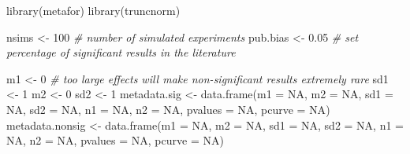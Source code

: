 \documentclass[
  oneside]{book}
\newenvironment{Shaded}{\begin{snugshade}}{\end{snugshade}}
\newcommand{\AttributeTok}[1]{\textcolor[rgb]{0.77,0.63,0.00}{#1}}
\newcommand{\CommentTok}[1]{\textcolor[rgb]{0.56,0.35,0.01}{\textit{#1}}}
\newcommand{\ConstantTok}[1]{\textcolor[rgb]{0.00,0.00,0.00}{#1}}
\newcommand{\DecValTok}[1]{\textcolor[rgb]{0.00,0.00,0.81}{#1}}
\newcommand{\FloatTok}[1]{\textcolor[rgb]{0.00,0.00,0.81}{#1}}
\newcommand{\FunctionTok}[1]{\textcolor[rgb]{0.00,0.00,0.00}{#1}}
\newcommand{\NormalTok}[1]{#1}
\newcommand{\OtherTok}[1]{\textcolor[rgb]{0.56,0.35,0.01}{#1}}
\begin{document}
\begin{Shaded}
\begin{Highlighting}[]
\FunctionTok{library}\NormalTok{(metafor)}
\FunctionTok{library}\NormalTok{(truncnorm)}

\NormalTok{nsims }\OtherTok{\textless{}{-}} \DecValTok{100} \CommentTok{\# number of simulated experiments}
\NormalTok{pub.bias }\OtherTok{\textless{}{-}} \FloatTok{0.05} \CommentTok{\# set percentage of significant results in the literature}

\NormalTok{m1 }\OtherTok{\textless{}{-}} \DecValTok{0} \CommentTok{\# too large effects will make non{-}significant results extremely rare}
\NormalTok{sd1 }\OtherTok{\textless{}{-}} \DecValTok{1}
\NormalTok{m2 }\OtherTok{\textless{}{-}} \DecValTok{0}
\NormalTok{sd2 }\OtherTok{\textless{}{-}} \DecValTok{1}
\NormalTok{metadata.sig }\OtherTok{\textless{}{-}} \FunctionTok{data.frame}\NormalTok{(}\AttributeTok{m1 =} \ConstantTok{NA}\NormalTok{, }\AttributeTok{m2 =} \ConstantTok{NA}\NormalTok{, }\AttributeTok{sd1 =} \ConstantTok{NA}\NormalTok{, }\AttributeTok{sd2 =} \ConstantTok{NA}\NormalTok{, }
                           \AttributeTok{n1 =} \ConstantTok{NA}\NormalTok{, }\AttributeTok{n2 =} \ConstantTok{NA}\NormalTok{, }\AttributeTok{pvalues =} \ConstantTok{NA}\NormalTok{, }\AttributeTok{pcurve =} \ConstantTok{NA}\NormalTok{)}
\NormalTok{metadata.nonsig }\OtherTok{\textless{}{-}} \FunctionTok{data.frame}\NormalTok{(}\AttributeTok{m1 =} \ConstantTok{NA}\NormalTok{, }\AttributeTok{m2 =} \ConstantTok{NA}\NormalTok{, }\AttributeTok{sd1 =} \ConstantTok{NA}\NormalTok{, }\AttributeTok{sd2 =} \ConstantTok{NA}\NormalTok{, }
                              \AttributeTok{n1 =} \ConstantTok{NA}\NormalTok{, }\AttributeTok{n2 =} \ConstantTok{NA}\NormalTok{, }\AttributeTok{pvalues =} \ConstantTok{NA}\NormalTok{, }\AttributeTok{pcurve =} \ConstantTok{NA}\NormalTok{)}


\end{Highlighting}
\end{Shaded}
\end{document}
